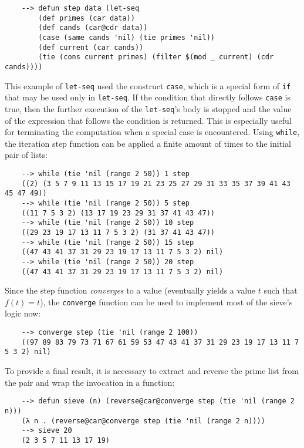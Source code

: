 \begin{Verbatim}
    --> defun step data (let-seq
        (def primes (car data))
        (def cands (car@cdr data))
        (case (same cands 'nil) (tie primes 'nil))
        (def current (car cands))
        (tie (cons current primes) (filter $(mod _ current) (cdr cands))))
\end{Verbatim}

This example of \verb|let-seq| used the construct \verb|case|, which is a special form of \verb|if| that may be used only in \verb|let-seq|. If the condition that directly follows \verb|case| is true, then the further execution of the \verb|let-seq|'s body is stopped and the value of the expression that follows the condition is returned. This is especially useful for terminating the computation when a special case is encountered. Using \verb|while|, the iteration step function can be applied a finite amount of times to the initial pair of lists:

\begin{Verbatim}
    --> while (tie 'nil (range 2 50)) 1 step
    ((2) (3 5 7 9 11 13 15 17 19 21 23 25 27 29 31 33 35 37 39 41 43 45 47 49))
    --> while (tie 'nil (range 2 50)) 5 step
    ((11 7 5 3 2) (13 17 19 23 29 31 37 41 43 47))
    --> while (tie 'nil (range 2 50)) 10 step
    ((29 23 19 17 13 11 7 5 3 2) (31 37 41 43 47))
    --> while (tie 'nil (range 2 50)) 15 step
    ((47 43 41 37 31 29 23 19 17 13 11 7 5 3 2) nil)
    --> while (tie 'nil (range 2 50)) 20 step
    ((47 43 41 37 31 29 23 19 17 13 11 7 5 3 2) nil)
\end{Verbatim}

Since the step function \textit{converges} to a value (eventually yields a value $t$ such that $f(t) = t$), the \verb|converge| function can be used to implement most of the sieve's logic now:

\begin{Verbatim}
    --> converge step (tie 'nil (range 2 100))
    ((97 89 83 79 73 71 67 61 59 53 47 43 41 37 31 29 23 19 17 13 11 7 5 3 2) nil)
\end{Verbatim}

To provide a final result, it is necessary to extract and reverse the prime list from the pair and wrap the invocation in a function:

\begin{Verbatim}
    --> defun sieve (n) (reverse@car@converge step (tie 'nil (range 2 n)))
    (λ n . (reverse@car@converge step (tie 'nil (range 2 n))))
    --> sieve 20
    (2 3 5 7 11 13 17 19)
\end{Verbatim}

